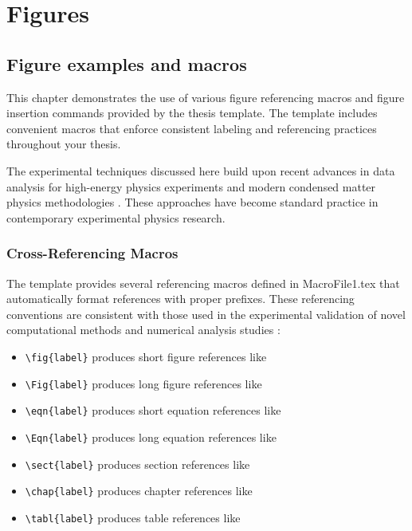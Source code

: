 \chapter{Figures}
\label{chap:DesignPrinciples}
\newrefsegment
\glsresetall

\section{Figure examples and macros}
\label{sect:figexamples}

This chapter demonstrates the use of various figure referencing macros and figure insertion commands provided by the thesis template. The template includes convenient macros that enforce consistent labeling and referencing practices throughout your thesis.

The experimental techniques discussed here build upon recent advances in data analysis for high-energy physics experiments \autocite{yourname2024photwest} and modern condensed matter physics methodologies \autocite{yourname2023labchar}. These approaches have become standard practice in contemporary experimental physics research.

\subsection{Cross-Referencing Macros}
\label{sect:crossref}

The template provides several referencing macros defined in MacroFile1.tex that automatically format references with proper prefixes. These referencing conventions are consistent with those used in the experimental validation of novel computational methods \autocite{yourname2023mnras} and numerical analysis studies \autocite{rodriguez2023opex}:

\begin{itemize}
    \item \texttt{\textbackslash fig\{label\}} produces short figure references like 
    \item \texttt{\textbackslash Fig\{label\}} produces long figure references like 
    \item \texttt{\textbackslash eqn\{label\}} produces short equation references like 
    \item \texttt{\textbackslash Eqn\{label\}} produces long equation references like 
    \item \texttt{\textbackslash sect\{label\}} produces section references like 
    \item \texttt{\textbackslash chap\{label\}} produces chapter references like 
    \item \texttt{\textbackslash tabl\{label\}} produces table references like 
\end{itemize}

